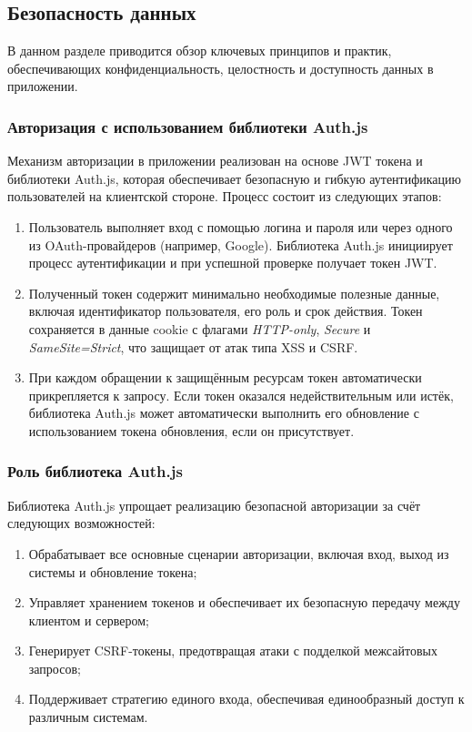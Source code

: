 \subsection{Безопасность данных}

В данном разделе приводится обзор ключевых принципов и практик, обеспечивающих конфиденциальность, целостность и доступность данных в приложении.

\subsubsection{Авторизация с использованием библиотеки Auth.js}
Механизм авторизации в приложении реализован на основе JWT токена и библиотеки Auth.js, которая обеспечивает безопасную и гибкую аутентификацию пользователей на клиентской стороне. Процесс состоит из следующих этапов:

\begin{enumerate}
  \item Пользователь выполняет вход с помощью логина и пароля или через одного из OAuth-провайдеров (например, Google). Библиотека Auth.js инициирует процесс аутентификации и при успешной проверке получает токен JWT.
  \item Полученный токен содержит минимально необходимые полезные данные, включая идентификатор пользователя, его роль и срок действия. Токен сохраняется в данные cookie с флагами \textit{HTTP-only}, \textit{Secure} и \textit{SameSite=Strict}, что защищает от атак типа XSS и CSRF.
  \item При каждом обращении к защищённым ресурсам токен автоматически прикрепляется к запросу. Если токен оказался недействительным или истёк, библиотека Auth.js может автоматически выполнить его обновление с использованием токена обновления, если он присутствует.
\end{enumerate}

\subsubsection{Роль библиотека Auth.js}
Библиотека Auth.js упрощает реализацию безопасной авторизации за счёт следующих возможностей:

\begin{enumerate}
  \item Обрабатывает все основные сценарии авторизации, включая вход, выход из системы и обновление токена;
  \item Управляет хранением токенов и обеспечивает их безопасную передачу между клиентом и сервером;
  \item Генерирует CSRF-токены, предотвращая атаки с подделкой межсайтовых запросов;
  \item Поддерживает стратегию единого входа, обеспечивая единообразный доступ к различным системам.
\end{enumerate}

